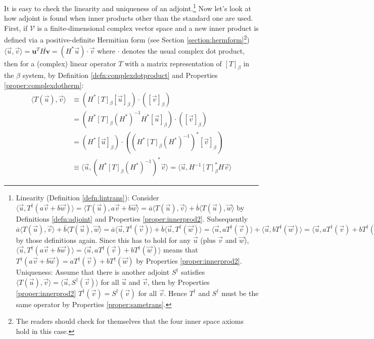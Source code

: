 It is easy to check the linearity and uniqueness of an adjoint.\footnote{Linearity (Definition \ref{defn:lintrans}): Consider $\langle \vec{u}, T^\dag(a\vec{v} + b\vec{w}) \rangle = \langle T(\vec{u}), a\vec{v} + b\vec{w} \rangle = \overline{a}\langle T(\vec{u}), \vec{v} \rangle + \overline{b}\langle T(\vec{u}), \vec{w} \rangle$ by Definitions \ref{defn:adjoint} and Properties \ref{proper:innerprod2}. Subsequently $\overline{a}\langle T(\vec{u}), \vec{v} \rangle + \overline{b}\langle T(\vec{u}), \vec{w} \rangle = \overline{a}\langle \vec{u}, T^\dag (\vec{v}) \rangle + \overline{b}\langle \vec{u}, T^\dag(\vec{w}) \rangle = \langle \vec{u}, aT^\dag(\vec{v}) \rangle + \langle \vec{u}, bT^\dag(\vec{w}) \rangle = \langle \vec{u}, aT^\dag(\vec{v}) + bT^\dag(\vec{w}) \rangle$ by those definitions again. Since this has to hold for any $\vec{u}$ (plus $\vec{v}$ and $\vec{w}$), $\langle \vec{u}, T^\dag(a\vec{v} + b\vec{w}) \rangle = \langle \vec{u}, aT^\dag(\vec{v}) + bT^\dag(\vec{w}) \rangle$ means that $T^\dag(a\vec{v} + b\vec{w}) = aT^\dag(\vec{v}) + bT^\dag(\vec{w})$ by Properties \ref{proper:innerprod2}. Uniqueness: Assume that there is another adjoint $S^\dag$ satisfies $\langle T(\vec{u}), \vec{v} \rangle = \langle \vec{u}, S^\dag(\vec{v}) \rangle$ for all $\vec{u}$ and $\vec{v}$, then by Properties \ref{proper:innerprod2} $T^\dag(\vec{v}) = S^\dag(\vec{v})$ for all $\vec{v}$. Hence $T^\dag$ and $S^\dag$ must be the same operator by Properties \ref{proper:sametrans}.} Now let's look at how adjoint is found when inner products other than the standard one are used. First, if $\mathcal{V}$ is a finite-dimensional complex vector space and a new inner product is defined via a positive-definite Hermitian form (see Section \ref{section:hermform}\footnote{The readers should check for themselves that the four inner space axioms hold in this case.}) $\langle \vec{u}, \vec{v} \rangle = \textbf{u}^T\overline{H\textbf{v}} = (H^*\vec{u})\cdot\vec{v}$ where $\cdot$ denotes the usual complex dot product, then for a (complex) linear operator $T$ with a matrix representation of $[T]_\beta$ in the $\beta$ system, by Definition \ref{defn:complexdotproduct} and Properties \ref{proper:complexdotherm}:
\begin{align*}
\langle T(\vec{u}), \vec{v} \rangle &\equiv (H^*[T]_\beta[\vec{u}]_\beta) \cdot ([\vec{v}]_\beta) \\
&= (H^*[T]_\beta (H^*)^{-1} H^* [\vec{u}]_\beta) \cdot ([\vec{v}]_\beta) \\
&= (H^*[\vec{u}]_\beta) \cdot ((H^*[T]_\beta (H^*)^{-1})^*[\vec{v}]_\beta) \\
&\equiv \langle \vec{u}, (H^*[T]_\beta (H^*)^{-1})^* \vec{v} \rangle = \langle \vec{u}, H^{-1} [T]_\beta^* H \vec{v} \rangle
\end{align*}
